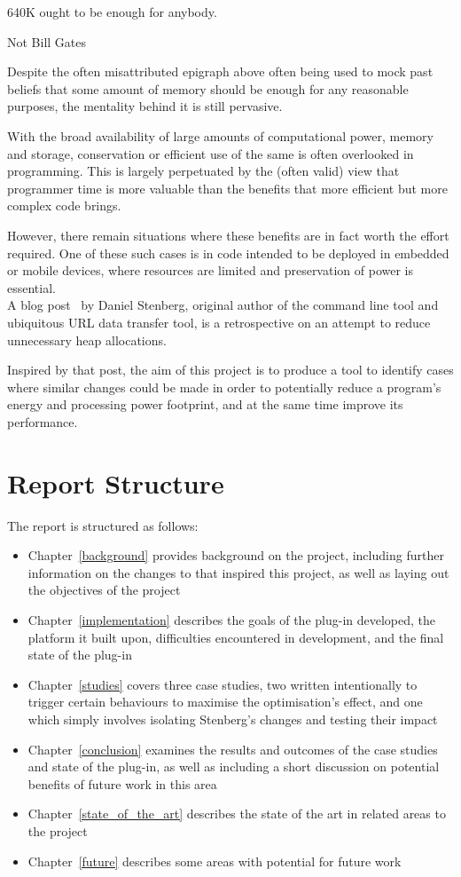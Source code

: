 \epigraph{640K ought to be enough for anybody.}{Not Bill Gates}

Despite the often misattributed epigraph above often being used to mock past beliefs that some amount of memory should be enough for any reasonable purposes, the mentality behind it is still pervasive.

With the broad availability of large amounts of computational power, memory and storage, conservation or efficient use of the same is often overlooked in programming. This is largely perpetuated by the (often valid) view that programmer time is more valuable than the benefits that more efficient but more complex code brings.

However, there remain situations where these benefits are in fact worth the effort required. One of these such cases is in code intended to be deployed in embedded or mobile devices, where resources are limited and preservation of power is essential. \\
A blog post~\cite{curlmalloc} by Daniel Stenberg, original author of the  command line tool and ubiquitous URL data transfer tool, is a retrospective on an attempt to reduce unnecessary heap allocations.

Inspired by that post, the aim of this project is to produce a tool to identify cases where similar changes could be made in order to potentially reduce a program's energy and processing power footprint, and at the same time improve its performance.

\section{Report Structure}

The report is structured as follows:

\begin{itemize}
	\item{Chapter~\ref{background} provides background on the project, including further information on the changes to  that inspired this project, as well as laying out the objectives of the project}
	\item{Chapter~\ref{implementation} describes the goals of the plug-in developed, the platform it built upon, difficulties encountered in development, and the final state of the plug-in}
	\item{Chapter~\ref{studies} covers three case studies, two written intentionally to trigger certain behaviours to maximise the optimisation's effect, and one which simply involves isolating Stenberg's changes and testing their impact}
	\item{Chapter~\ref{conclusion} examines the results and outcomes of the case studies and state of the plug-in, as well as including a short discussion on potential benefits of future work in this area}
	\item{Chapter~\ref{state_of_the_art} describes the state of the art in related areas to the project}
	\item{Chapter~\ref{future} describes some areas with potential for future work}
\end{itemize}
